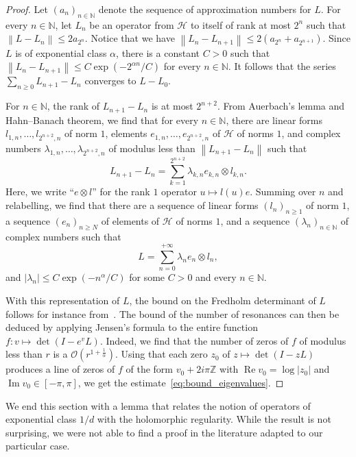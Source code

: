 \documentclass[AHL,Unicode,longabstracts,published]{cedram}
\DeclareMathOperator{\im}{Im}
\DeclareMathOperator{\re}{Re}
\newcommand{\n}[1]{\left\|#1\right\|}
\newcommand{\clO}{\mathcal{O}}
\newcommand{\clH}{\mathcal{H}}
\newcommand{\bbZ}{\mathbb{Z}}
\newcommand{\bbN}{\mathbb{N}}
\newcommand{\clO}{\mathcal{O}}
\begin{document}
\begin{proof}
Let $(a_n)_{n \in \bbN}$ denote the sequence of approximation numbers for $L$. For every $n \in \bbN$, let $L_n$ be an operator from $\clH$ to itself of rank at most $2^n$ such that $\n{L - L_n} \leq 2 a_{2^n}$. Notice that we have $\n{L_n - L_{n+1}} \leq 2 (a_{2^n} + a_{2^{n+1}})$. Since $L$ is of exponential class $\alpha$, there is a constant $C > 0$ such that $\n{L_n - L_{n+1}} \leq C \exp(- 2^{\alpha n}/C)$ for every $n \in \bbN$. It follows that the series $\sum_{n \geq 0} L_{n+1} - L_{n}$ converges to $L - L_0$.

For $n \in \bbN$, the rank of $L_{n+1} - L_n$ is at most $2^{n+2}$. From Auerbach's lemma and Hahn--Banach theorem, we find that for every $n \in \bbN$, there are linear forms $l_{1,n}, \dots, l_{2^{n+2},n}$ of norm $1$, elements $e_{1,n},\dots,e_{2^{n+2},n}$ of $\clH$ of norms $1$, and complex numbers $\lambda_{1,n}, \dots, \lambda_{2^{n+2},n}$ of modulus less than $\n{L_{n+1} - L_n}$ such that
\begin{equation*}
L_{n+1} - L_n = \sum_{k = 1}^{2^{n+2}} \lambda_{k,n} e_{k,n} \otimes l_{k,n}.
\end{equation*}
Here, we write ``$e \otimes l$'' for the rank $1$ operator $u \mapsto l(u) e$. Summing over $n$ and relabelling, we find that there are a sequence of linear forms $(l_n)_{n \geq 1}$ of norm $1$, a sequence $(e_n)_{n \geq N}$ of elements of $\clH$ of norms $1$, and a sequence $(\lambda_n)_{n \in \bbN}$ of complex numbers such that
\begin{equation*}
L = \sum_{n = 0}^{+ \infty} \lambda_n e_n \otimes l_n,
\end{equation*}
and $|\lambda_n| \leq C \exp(- n^\alpha/C)$ for some $C > 0$ and every $n \in \bbN$.

With this representation of $L$, the bound on the Fredholm determinant of $L$ follows for instance from~\cite[Lemma~2.13]{local_and_global}. The bound of the number of resonances can then be deduced by applying Jensen's formula to the entire function $f : v \mapsto \det(I - e^v L)$. Indeed, we find that the number of zeros of $f$ of modulus less than $r$ is a $\clO(r^{1 + \frac{1}{\alpha}})$. Using that each zero $z_0$ of $z \mapsto \det(I - zL)$ produces a line of zeros of $f$ of the form $v_0 + 2i \pi \bbZ$ with $\re v_0 = \log |z_0|$ and $\im v_0 \in [-\pi,\pi]$, we get the estimate~\eqref{eq:bound_eigenvalues}.
\end{proof}

We end this section with a lemma that relates the notion of operators of exponential class $1/d$ with the holomorphic regularity. While the result is not surprising, we were not able to find a proof in the literature adapted to our particular case.
\end{document}

